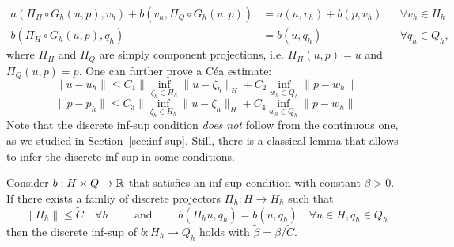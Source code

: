     \begin{equation}
        \begin{aligned}
            a(\Pi_H \circ G_h(u,p), v_h) + b(v_h, \Pi_Q \circ G_h(u,p)) &= a(u, v_h) + b(p, v_h) && \forall v_h \in H_h\\
            b(\Pi_H \circ G_h(u,p), q_h) &= b(u, q_h) && \forall q_h \in Q_h,
        \end{aligned}
    \end{equation}
    where $\Pi_H$ and $\Pi_Q$ are simply component projections, i.e. $\Pi_H(u,p) = u$ and $\Pi_Q(u,p) = p$. One can further prove a Céa estimate: 
    \begin{equation}
        \| u - u_h\| \leq C_1 \|\inf_{\zeta_h \in H_h}\| u -\zeta_h \|_H + C_2\inf_{w_h\in Q_h}\| p -w_h\|
    \end{equation}
    \begin{equation}
        \|p - p_h\| \leq C_3 \|\inf_{\zeta_h \in H_h}\| u -\zeta_h \|_H + C_4\inf_{w_h\in Q_h}\| p -w_h\|
    \end{equation}
Note that the discrete inf-sup condition \emph{does not} follow from the continuous one, as we studied in Section~\ref{sec:inf-sup}. Still, there is a classical lemma that allows to infer the discrete inf-sup in some conditions. 
\begin{lemma}\label{lemma:fortin}
    Consider $b:H\times Q\to \mathbb{R}$ that satisfies an inf-sup condition with constant $\beta >0$. If there exists a famliy of discrete projectors $\Pi_h: H\to H_h$ such that 
    \begin{equation}
        \|\Pi_h \|\leq \tilde C \quad \forall h \qquad \text{ and } \qquad b(\Pi_h u, q_h) = b(u, q_h) \quad\forall u\in H, q_h \in Q_h
    \end{equation}
    then the discrete inf-sup of $b:H_h\to Q_h$ holds with $\tilde \beta = \beta / \tilde C$.
\end{lemma}